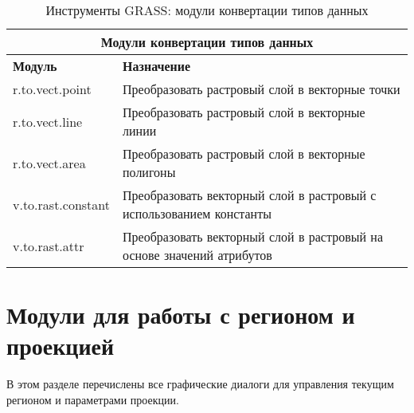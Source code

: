 {\renewcommand{\arraystretch}{0.7}
\begin{table}[H]
\centering
 \begin{tabular}{|p{4cm}|p{10cm}|}
  \hline \multicolumn{2}{|c|}{\textbf{Модули конвертации типов данных}} \\
  \hline \textbf{Модуль} & \textbf{Назначение} \\
  \hline r.to.vect.point & Преобразовать растровый слой в векторные точки \\
  \hline r.to.vect.line & Преобразовать растровый слой в векторные линии \\
  \hline r.to.vect.area & Преобразовать растровый слой в векторные полигоны \\
  \hline v.to.rast.constant & Преобразовать векторный слой в растровый
  с использованием константы \\
  \hline v.to.rast.attr & Преобразовать векторный слой в растровый на
  основе значений атрибутов \\
\hline
\end{tabular}
 \caption{Инструменты GRASS: модули конвертации типов данных}
\end{table}}


\section{Модули для работы с регионом и проекцией}

В этом разделе перечислены все графические диалоги для управления
текущим регионом и параметрами проекции.

